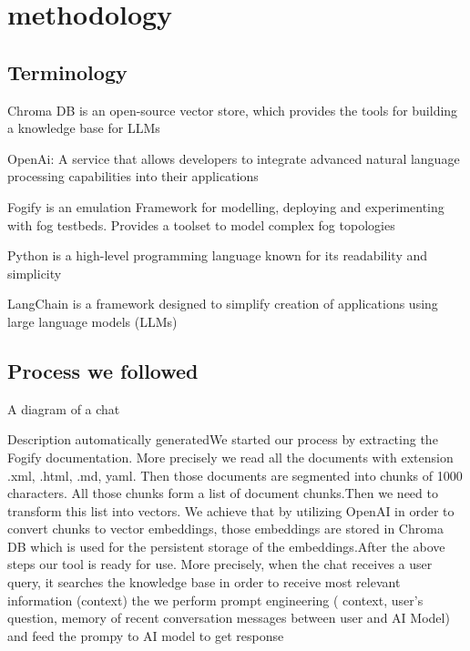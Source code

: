 \section{methodology}
\label{sec:methodology}

\subsection{Terminology}

Chroma DB is an open-source vector store, which provides the tools for building
a knowledge base for LLMs

OpenAi: A service that allows developers to integrate advanced natural language
processing capabilities into their applications

Fogify	is an emulation Framework for modelling, deploying and experimenting
with fog testbeds. Provides a toolset to model complex fog topologies

Python is a high-level programming language known for its readability and
simplicity

LangChain is a framework designed to simplify creation of applications using
large language models (LLMs)

\subsection{Process we followed}
A diagram of a chat

Description automatically generatedWe started our process by extracting the
Fogify documentation. More precisely we read all the documents with extension
.xml, .html, .md, yaml. Then those documents are segmented into chunks of 1000
characters. All those chunks form a list of document chunks.Then we need to
transform this list into vectors. We achieve that by utilizing OpenAI in order
to convert chunks to vector embeddings, those embeddings are stored in Chroma
DB which is used for the persistent storage of the embeddings.After the above
steps our tool is ready for use. More precisely, when the chat receives a user
query, it searches the knowledge base in order to receive most relevant
information (context) the we perform prompt engineering  ( context, user's
question, memory of recent conversation messages between user and AI Model) and
feed the prompy to AI model to get response